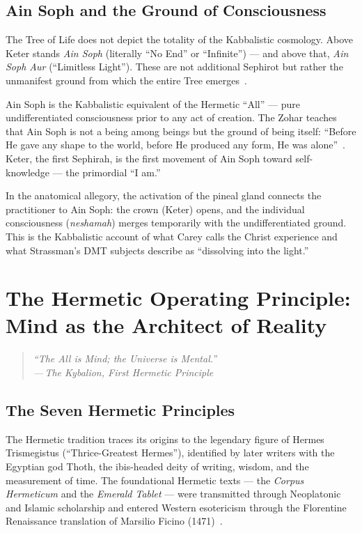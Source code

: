 \documentclass[12pt, a4paper]{article}
\newcommand{\epigraph}[2]{%
  \begin{quote}
    \itshape ``#1''\\[0.3em]
    \normalfont\small\hfill ---\,#2
  \end{quote}
}
\begin{document}
\subsection{Ain Soph and the Ground of Consciousness}

The Tree of Life does not depict the totality of the Kabbalistic cosmology.
Above Keter stands \emph{Ain Soph} (literally ``No End'' or ``Infinite'') —
and above that, \emph{Ain Soph Aur} (``Limitless Light''). These are not
additional Sephirot but rather the unmanifest ground from which the entire
Tree emerges~\autocite[88]{scholem1974}.

Ain Soph is the Kabbalistic equivalent of the Hermetic ``All'' — pure
undifferentiated consciousness prior to any act of creation. The Zohar
teaches that Ain Soph is not a being among beings but the ground of being
itself: ``Before He gave any shape to the world, before He produced any form,
He was alone''~\autocite[89]{zohar2003}. Keter, the first Sephirah, is the
first movement of Ain Soph toward self-knowledge — the primordial ``I am.''

In the anatomical allegory, the activation of the pineal gland connects the
practitioner to Ain Soph: the crown (Keter) opens, and the individual
consciousness (\emph{neshamah}) merges temporarily with the undifferentiated
ground. This is the Kabbalistic account of what Carey calls the Christ
experience and what Strassman's DMT subjects describe as ``dissolving into the
light.''

\section{The Hermetic Operating Principle: Mind as the Architect of Reality}
\label{sec:hermeticism}

\epigraph{The All is Mind; the Universe is Mental.}{The Kybalion, First
Hermetic Principle}

\subsection{The Seven Hermetic Principles}

The Hermetic tradition traces its origins to the legendary figure of Hermes
Trismegistus (``Thrice-Greatest Hermes''), identified by later writers with
the Egyptian god Thoth, the ibis-headed deity of writing, wisdom, and the
measurement of time. The foundational Hermetic texts — the \emph{Corpus
Hermeticum} and the \emph{Emerald Tablet} — were transmitted through
Neoplatonic and Islamic scholarship and entered Western esotericism through
the Florentine Renaissance translation of Marsilio Ficino
(1471)~\autocite{corpushermeticum}.
\end{document}
